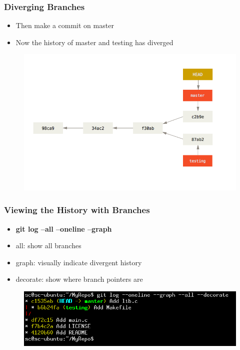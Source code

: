 \documentclass{beamer}
\begin{document}
\begin{frame}
	\frametitle{Diverging Branches}
	\begin{itemize}
		\item{Then make a commit on master}
		\item{Now the history of master and testing has diverged}
	\end{itemize}
	\begin{figure}
		\includegraphics[scale=0.4]{Diverging_Branches-2.png}
	\end{figure}
\end{frame}

\begin{frame}
	\frametitle{Viewing the History with Branches}
	\begin{itemize}
		\item{\textbf{git log --all --oneline --graph}}
		\item{all: show all branches}
		\item{graph: visually indicate divergent history}
		\item{decorate: show where branch pointers are}
	\end{itemize}
	\begin{figure}
		\includegraphics[scale=0.45]{Viewing_the_History_With_Branches-0.png}
	\end{figure}
\end{frame}
\end{document}
